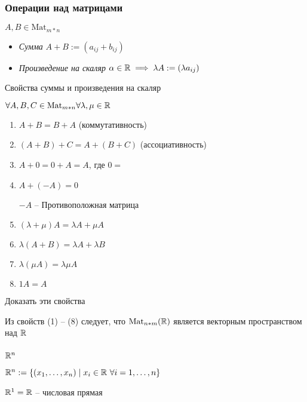 \subsubsection{Операции над матрицами}

\( A, B \in \text{Mat}_{m*n} \)

\begin{itemize}
	\item \emph{Сумма} \( A + B := (a_{ij} + b_{ij}) \)
	\item \emph{Произведение на скаляр} \( \alpha \in \mathbb{R} \implies \lambda A := (\lambda a_{ij})\)
\end{itemize}

Свойства суммы и произведения на скаляр

\( \forall A, B, C  \in \text{Mat}_{m*n} \forall \lambda, \mu \in \mathbb{R} \)
\begin{enumerate}[label=(\arabic*), nosep]
	\item \( A + B = B + A \) (коммутативность)
	\item \( (A + B) + C = A + (B + C)\) (ассоциативность)
	\item \( A + 0 = 0 + A = A\), где \( 0 = \) %
	\item \( A + (-A) = 0 \)
	
	\( -A \) -- Противоположная матрица
	\item \( (\lambda + \mu) A = \lambda A + \mu A \)
	\item \( \lambda (A + B) = \lambda A + \lambda B \)
	\item \( \lambda (\mu A) = \lambda \mu A \)
	\item \( 1 A = A \)
\end{enumerate}

\begin{exercise}
	Доказать эти свойства
\end{exercise}

\begin{remark}
	Из свойств (1) -- (8) следует, что \( \text{Mat}_{n*m}(\mathbb{R}) \) является векторным пространством над \( \mathbb{R} \)
\end{remark}

\subsubsection{\(\mathbb{R}^n\)}
\( \mathbb{R}^n := \{ (x_1, \dots, x_n) \mid x_i \in \mathbb{R} \ \forall i = 1, \dots, n \} \)

\( \mathbb{R}^1 = \mathbb{R} \) \quad -- числовая прямая

